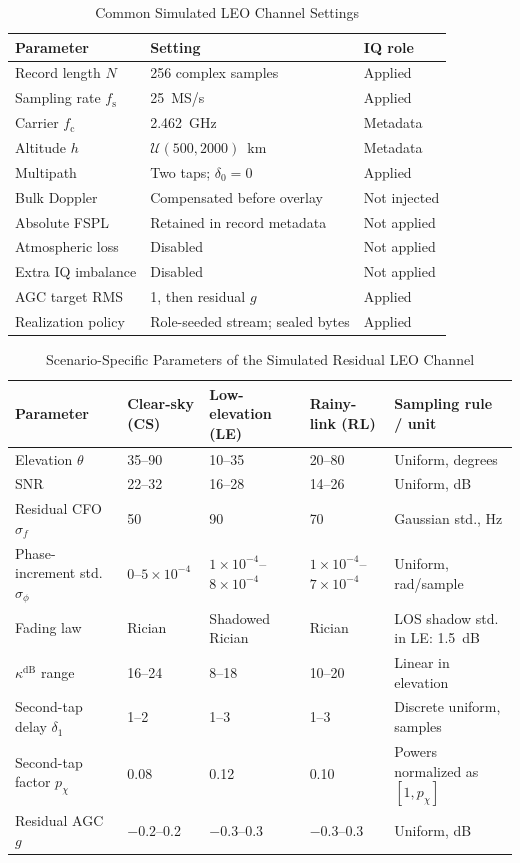 \documentclass[journal]{IEEEtran}
\begin{document}
\begin{table}[t]
\caption{Common Simulated LEO Channel Settings}
\label{tab:leo_common}
\centering
\footnotesize
\begin{tabular}{p{}p{}p{}}
\toprule
Parameter & Setting & IQ role \\
\midrule
Record length \(N\) & 256 complex samples & Applied \\
Sampling rate \(f_{\mathrm{s}}\) & 25~MS/s & Applied \\
Carrier \(f_{\mathrm{c}}\) & 2.462~GHz & Metadata \\
Altitude \(h\) & \(\mathcal{U}(500,2000)\)~km & Metadata \\
Multipath & Two taps; \(\delta_0=0\) & Applied \\
Bulk Doppler & Compensated before overlay & Not injected \\
Absolute FSPL & Retained in record metadata & Not applied \\
Atmospheric loss & Disabled & Not applied \\
Extra IQ imbalance & Disabled & Not applied \\
AGC target RMS & 1, then residual \(g\) & Applied \\
Realization policy & Role-seeded stream; sealed bytes & Applied \\
\bottomrule
\end{tabular}
\end{table}

\begin{table}[t]
\caption{Scenario-Specific Parameters of the Simulated Residual LEO Channel}
\label{tab:leo_profiles}
\centering
\footnotesize
\setlength{\tabcolsep}{4.2pt}
\begin{tabular}{p{}p{}p{}p{}p{}}
\toprule
Parameter & Clear-sky (CS) & Low-elevation (LE) & Rainy-link (RL) & Sampling rule / unit \\
\midrule
Elevation \(\theta\) & 35--90 & 10--35 & 20--80 & Uniform, degrees \\
SNR & 22--32 & 16--28 & 14--26 & Uniform, dB \\
Residual CFO \(\sigma_f\) & 50 & 90 & 70 & Gaussian std., Hz \\
Phase-increment std. \(\sigma_\phi\) & \(0\)--\(5{\times}10^{-4}\) & \(1{\times}10^{-4}\)--\(8{\times}10^{-4}\) & \(1{\times}10^{-4}\)--\(7{\times}10^{-4}\) & Uniform, rad/sample \\
Fading law & Rician & Shadowed Rician & Rician & LOS shadow std. in LE: 1.5~dB \\
\(\kappa^{\mathrm{dB}}\) range & 16--24 & 8--18 & 10--20 & Linear in elevation \\
Second-tap delay \(\delta_1\) & 1--2 & 1--3 & 1--3 & Discrete uniform, samples \\
Second-tap factor \(p_\chi\) & 0.08 & 0.12 & 0.10 & Powers normalized as \([1,p_\chi]\) \\
Residual AGC \(g\) & \(-0.2\)--0.2 & \(-0.3\)--0.3 & \(-0.3\)--0.3 & Uniform, dB \\
\bottomrule
\end{tabular}
\end{table}
\end{document}
